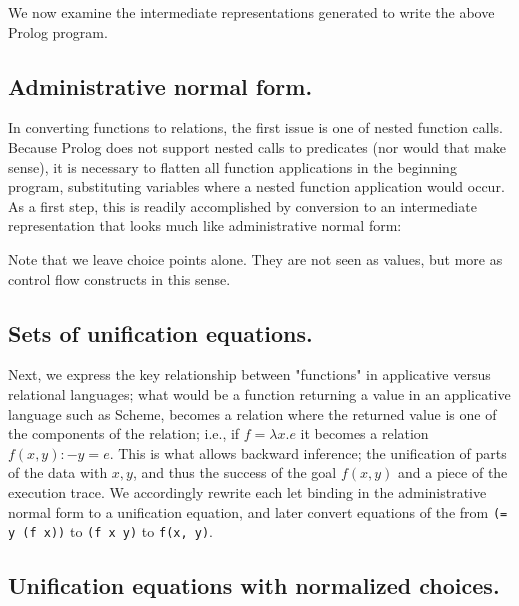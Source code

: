 \documentclass{acmsiggraph}
\begin{document}
We now examine the intermediate representations generated to write the above
Prolog program.  

\subsection{Administrative normal form.}

In converting functions to relations, the first issue is one
of nested function calls.  Because Prolog does not support nested calls to
predicates (nor would that make sense), it is necessary to flatten all function
applications in the beginning program, substituting variables where a nested
function application would occur.  As a first step, this is readily
accomplished by conversion to an intermediate representation that looks much
like administrative normal form:

\lstset{language=LISP}


Note that we leave choice points alone. They are not seen as values, but more
as control flow constructs in this sense.

\subsection{Sets of unification equations.}

Next, we express the key relationship between "functions" in applicative versus
relational languages; what would be a function returning a value in an
applicative language such as Scheme, becomes a relation where the returned
value is one of the components of the relation; 
i.e., if $f = \lambda x . e$ 
it becomes a relation $f(x, y) :- y = e$. 
This is what allows backward inference; the unification of parts of the data with $x, y$,
and thus the success of the goal $f(x, y)$ and a piece of the execution trace.
We accordingly rewrite each let binding in the administrative normal form to a
unification equation, and later convert equations of the from \verb!(= y (f x))! to \verb!(f x y)! to \verb!f(x, y)!.



\subsection{Unification equations with normalized choices.}
\end{document}

